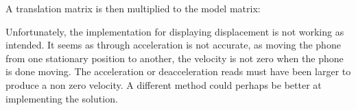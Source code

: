 A translation matrix is then multiplied to the model matrix:


Unfortunately, the implementation for displaying displacement is not working as intended.
It seems as through acceleration is not accurate, as moving the phone from one stationary position to another, the velocity is not zero when the phone is done moving.
The acceleration or deacceleration reads must have been larger to produce a non zero velocity.
A different method could perhaps be better at implementing the solution.